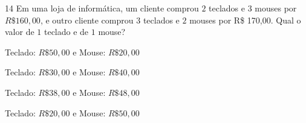 
\num{14} Em uma loja de informática, um cliente comprou $2$ teclados e $3$ mouses
por $R\$160,00$, e outro cliente comprou $3$ teclados e $2$ mouses por R\$
170,00. Qual o valor de $1$ teclado e de $1$ mouse?

\begin{escolha}
\item Teclado: $R\$50,00$ e Mouse: $R\$20,00$
\item Teclado: $R\$30,00$ e Mouse: $R\$40,00$
\item Teclado: $R\$38,00$ e Mouse: $R\$48,00$
\item Teclado: $R\$20,00$ e Mouse: $R\$50,00$
\end{escolha}



